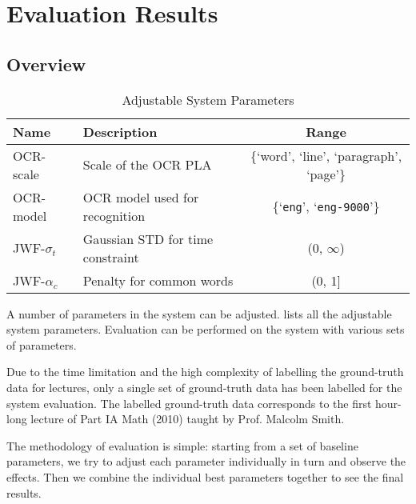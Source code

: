 
\chapter{Evaluation Results}
\label{chap:eval-results}

\ifpdf
    \graphicspath{{Chapter9/Figs/Raster/}{Chapter9/Figs/PDF/}{Chapter9/Figs/}}
\else
    \graphicspath{{Chapter9/Figs/Vector/}{Chapter9/Figs/}}
\fi


\section{Overview}

\begin{table}[!htb]
    \caption{Adjustable System Parameters}
    \centering
    \label{tab:sys-param-list}
    \begin{tabular}{l l c}
    \toprule
    Name & Description & Range \\
    \midrule
    OCR-scale & Scale of the OCR PLA & \{`word', `line', `paragraph', `page'\} \\
    OCR-model & OCR model used for recognition & \{`\texttt{eng}', `\texttt{eng-9000}'\} \\
    JWF-$\sigma_t$ & Gaussian STD for time constraint & (0, $\infty$) \\
    JWF-$\alpha_c$ & Penalty for common words & (0, 1]\\
    \bottomrule
    \end{tabular}
\end{table}

A number of parameters in the system can be adjusted.  lists all the adjustable system parameters. Evaluation can be performed on the system with various sets of parameters.

Due to the time limitation and the high complexity of labelling the ground-truth data for lectures, only a single set of ground-truth data has been labelled for the system evaluation. The labelled ground-truth data corresponds to the first hour-long lecture of Part IA Math (2010) taught by Prof. Malcolm Smith.

The methodology of evaluation is simple: starting from a set of baseline parameters, we try to adjust each parameter individually in turn and observe the effects. Then we combine the individual best parameters together to see the final results.

